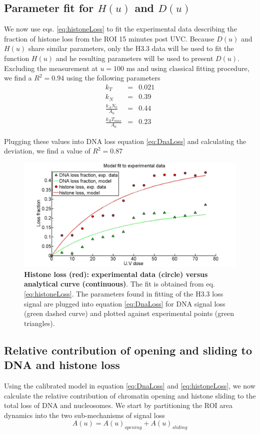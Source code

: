 \documentclass[12pt]{article}
\begin{document}
\subsection{Parameter fit for $H(u)$ and $D(u)$ }\label{subsection:parameterFit}
We now use eqs. \ref{eq:histoneLoss} to fit the experimental data describing the fraction of histone loss from the ROI 15 minutes post UVC. Because $D(u)$ and $H(u)$ share similar parameters, only the H3.3 data will be used to fit the function $H(u)$ and he resulting parameters will be used to present $D(u)$. 
Excluding the measurement at $u=100$ ms and using classical fitting procedure, we find a $R^2= 0.94$ using the following parameters
\begin{eqnarray*}
k_T &=&  0.021\\
k_N &=&  0.39\\
\frac{k_AN_0}{A_0}&=& 0.44\\
\frac{k_BT_{max}}{A_0}&=& 0.23
\end{eqnarray*}

Plugging these values into DNA loss equation \ref{eq:DnaLoss} and calculating the deviation, we find a value of $R^2=0.87$
\begin{figure}[H]
\centering
\includegraphics[width=0.6\linewidth, height=0.3\textheight]{histoneAndDnaVsUvDoseModelFit}
\caption{\textbf{Histone loss (red): experimental data (circle) versus analytical curve (continuous)}. The fit is obtained from  eq. \ref{eq:histoneLoss}. The parameters found in fitting of the H3.3 loss signal are plugged into equation \ref{eq:DnaLoss} for DNA signal loss (green dashed curve) and plotted against experimental points (green triangles).}
\label{fig:histoneAndDnaVsUvDoseModelFit}
\end{figure}

\subsection{Relative contribution of opening and sliding to DNA and histone loss}
Using the calibrated model in equation \ref{eq:DnaLoss} and \ref{eq:histoneLoss}, we now calculate the relative contribution of chromatin opening and histone sliding to the total loss of DNA and nucleosomes.
We start by partitioning the ROI area dynamics into the two sub-mechanisms of signal loss
\begin{equation*}
A(u) = A(u)_{opening}+A(u)_{sliding}
\end{equation*}
\end{document}
